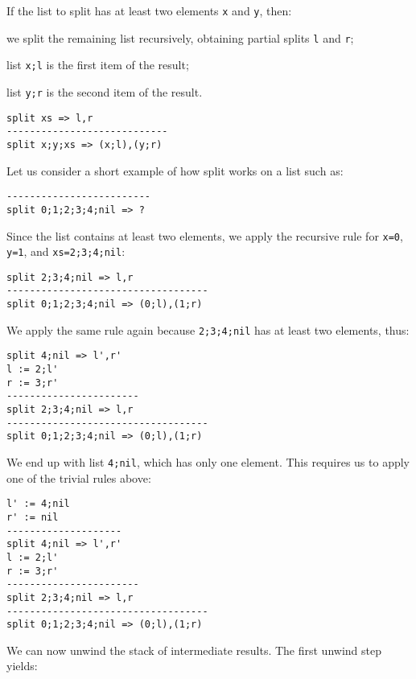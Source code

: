 If the list to split has at least two elements \texttt{x} and \texttt{y}, then:
\begin{inparaenum}
\item we split the remaining list recursively, obtaining partial splits \texttt{l} and \texttt{r};
\item list \texttt{x;l} is the first item of the result;
\item list \texttt{y;r} is the second item of the result.
\end{inparaenum}

\begin{lstlisting}
split xs => l,r
----------------------------
split x;y;xs => (x;l),(y;r)
\end{lstlisting}

Let us consider a short example of how split works on a list such as:

\begin{lstlisting}
-------------------------
split 0;1;2;3;4;nil => ?
\end{lstlisting}

Since the list contains at least two elements, we apply the recursive rule for \texttt{x=0}, \texttt{y=1}, and \texttt{xs=2;3;4;nil}:

\begin{lstlisting}
split 2;3;4;nil => l,r
-----------------------------------
split 0;1;2;3;4;nil => (0;l),(1;r)
\end{lstlisting}

We apply the same rule again because \texttt{2;3;4;nil} has at least two elements, thus:

\begin{lstlisting}
split 4;nil => l',r'
l := 2;l'
r := 3;r'
-----------------------
split 2;3;4;nil => l,r
-----------------------------------
split 0;1;2;3;4;nil => (0;l),(1;r)
\end{lstlisting}

We end up with list \texttt{4;nil}, which has only one element. This requires us to apply one of the trivial rules above:

\begin{lstlisting}
l' := 4;nil
r' := nil
--------------------
split 4;nil => l',r'
l := 2;l'
r := 3;r'
-----------------------
split 2;3;4;nil => l,r
-----------------------------------
split 0;1;2;3;4;nil => (0;l),(1;r)
\end{lstlisting}

We can now unwind the stack of intermediate results. The first unwind step yields:

